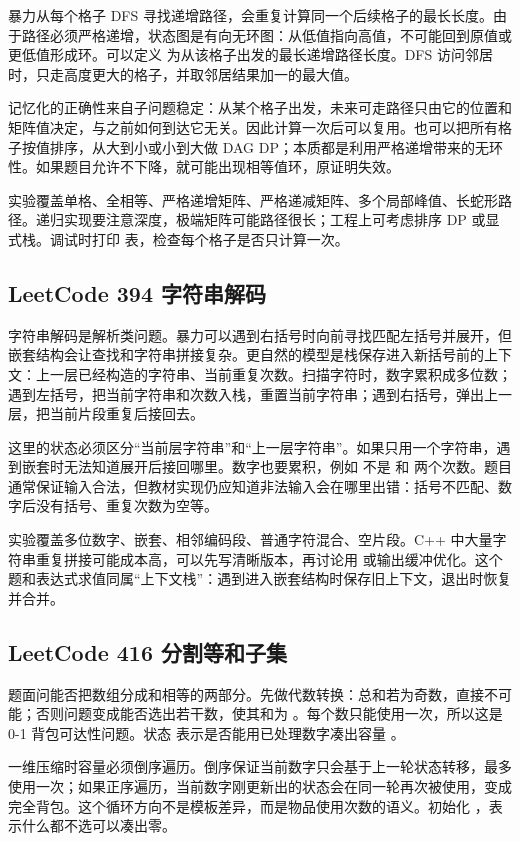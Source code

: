 暴力从每个格子 DFS 寻找递增路径，会重复计算同一个后续格子的最长长度。由于路径必须严格递增，状态图是有向无环图：从低值指向高值，不可能回到原值或更低值形成环。可以定义  为从该格子出发的最长递增路径长度。DFS 访问邻居时，只走高度更大的格子，并取邻居结果加一的最大值。

记忆化的正确性来自子问题稳定：从某个格子出发，未来可走路径只由它的位置和矩阵值决定，与之前如何到达它无关。因此计算一次后可以复用。也可以把所有格子按值排序，从大到小或小到大做 DAG DP；本质都是利用严格递增带来的无环性。如果题目允许不下降，就可能出现相等值环，原证明失效。

实验覆盖单格、全相等、严格递增矩阵、严格递减矩阵、多个局部峰值、长蛇形路径。递归实现要注意深度，极端矩阵可能路径很长；工程上可考虑排序 DP 或显式栈。调试时打印  表，检查每个格子是否只计算一次。

\subsection{LeetCode 394 字符串解码}

字符串解码是解析类问题。暴力可以遇到右括号时向前寻找匹配左括号并展开，但嵌套结构会让查找和字符串拼接复杂。更自然的模型是栈保存进入新括号前的上下文：上一层已经构造的字符串、当前重复次数。扫描字符时，数字累积成多位数；遇到左括号，把当前字符串和次数入栈，重置当前字符串；遇到右括号，弹出上一层，把当前片段重复后接回去。

这里的状态必须区分“当前层字符串”和“上一层字符串”。如果只用一个字符串，遇到嵌套时无法知道展开后接回哪里。数字也要累积，例如  不是  和  两个次数。题目通常保证输入合法，但教材实现仍应知道非法输入会在哪里出错：括号不匹配、数字后没有括号、重复次数为空等。

实验覆盖多位数字、嵌套、相邻编码段、普通字符混合、空片段。C++ 中大量字符串重复拼接可能成本高，可以先写清晰版本，再讨论用  或输出缓冲优化。这个题和表达式求值同属“上下文栈”：遇到进入嵌套结构时保存旧上下文，退出时恢复并合并。

\subsection{LeetCode 416 分割等和子集}

题面问能否把数组分成和相等的两部分。先做代数转换：总和若为奇数，直接不可能；否则问题变成能否选出若干数，使其和为 。每个数只能使用一次，所以这是 0-1 背包可达性问题。状态  表示是否能用已处理数字凑出容量 。

一维压缩时容量必须倒序遍历。倒序保证当前数字只会基于上一轮状态转移，最多使用一次；如果正序遍历，当前数字刚更新出的状态会在同一轮再次被使用，变成完全背包。这个循环方向不是模板差异，而是物品使用次数的语义。初始化 ，表示什么都不选可以凑出零。

